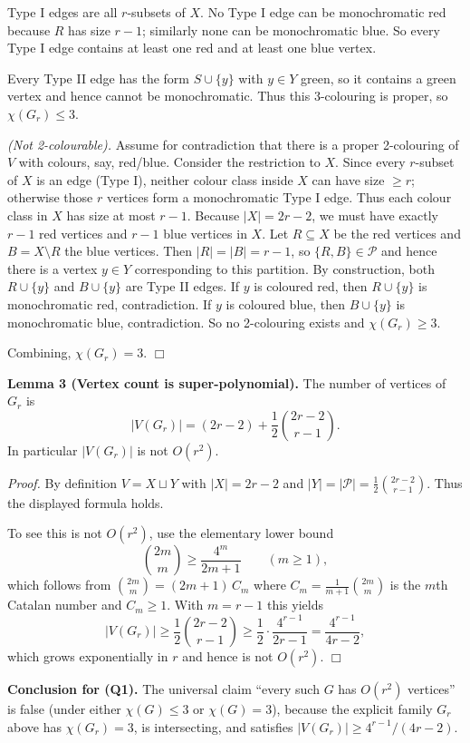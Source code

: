 Type I edges are all $r$-subsets of $X$.
No Type I edge can be monochromatic red because $R$ has size $r-1$; similarly none can be monochromatic blue.
So every Type I edge contains at least one red and at least one blue vertex.

Every Type II edge has the form $S\cup\{y\}$ with $y\in Y$ green, so it contains a green vertex and hence cannot be monochromatic.
Thus this 3-colouring is proper, so $\chi(G_r)\le 3$.

\emph{(Not 2-colourable).}
Assume for contradiction that there is a proper 2-colouring of $V$ with colours, say, red/blue.
Consider the restriction to $X$.
Since every $r$-subset of $X$ is an edge (Type I), neither colour class inside $X$ can have size $\ge r$; otherwise those $r$ vertices form a monochromatic Type I edge.
Thus each colour class in $X$ has size at most $r-1$.
Because $|X|=2r-2$, we must have exactly $r-1$ red vertices and $r-1$ blue vertices in $X$.
Let $R\subseteq X$ be the red vertices and $B=X\setminus R$ the blue vertices.
Then $|R|=|B|=r-1$, so $\{R,B\}\in\mathcal P$ and hence there is a vertex $y\in Y$ corresponding to this partition.
By construction, both $R\cup\{y\}$ and $B\cup\{y\}$ are Type II edges.
If $y$ is coloured red, then $R\cup\{y\}$ is monochromatic red, contradiction.
If $y$ is coloured blue, then $B\cup\{y\}$ is monochromatic blue, contradiction.
So no 2-colouring exists and $\chi(G_r)\ge 3$.

Combining, $\chi(G_r)=3$. \hfill$\Box$

\medskip
\noindent\textbf{Lemma 3 (Vertex count is super-polynomial).}
The number of vertices of $G_r$ is
\[
|V(G_r)|=(2r-2)+\frac12\binom{2r-2}{r-1}.
\]
In particular $|V(G_r)|$ is not $O(r^2)$.

\noindent\emph{Proof.}
By definition $V=X\sqcup Y$ with $|X|=2r-2$ and $|Y|=|\mathcal P|=\frac12\binom{2r-2}{r-1}$.
Thus the displayed formula holds.

To see this is not $O(r^2)$, use the elementary lower bound
\[
\binom{2m}{m}\ge \frac{4^m}{2m+1}\qquad(m\ge 1),
\]
which follows from $\binom{2m}{m}=(2m+1)\,C_m$ where $C_m=\frac{1}{m+1}\binom{2m}{m}$ is the $m$th Catalan number and $C_m\ge 1$.
With $m=r-1$ this yields
\[
|V(G_r)|\ge \frac12\binom{2r-2}{r-1}\ge \frac12\cdot \frac{4^{r-1}}{2r-1}=\frac{4^{r-1}}{4r-2},
\]
which grows exponentially in $r$ and hence is not $O(r^2)$. \hfill$\Box$

\medskip
\noindent\textbf{Conclusion for (Q1).}
The universal claim ``every such $G$ has $O(r^2)$ vertices'' is false (under either $\chi(G)\le 3$ or $\chi(G)=3$), because the explicit family $G_r$ above has $\chi(G_r)=3$, is intersecting, and satisfies $|V(G_r)|\ge 4^{r-1}/(4r-2)$.

